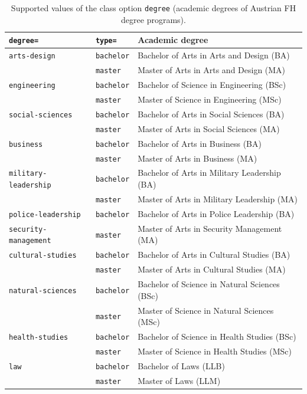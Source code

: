 \documentclass[language=english]{hgbarticle}
\begin{document}
\begin{table}[H]
\caption{Supported values of the class option \texttt{degree} (academic degrees of Austrian FH degree programs).}
\label{tab:AcademicDegrees}
\centering\small
\begin{tabular}{@{}lll@{}}
	\toprule
	\texttt{degree=} & \texttt{type=} & Academic degree \\
	\midrule
	\texttt{arts-design}         & \texttt{bachelor} & Bachelor of Arts in Arts and Design (BA) \\
	                             & \texttt{master}   & Master of Arts in Arts and Design (MA) \\ \addlinespace
	\texttt{engineering}         & \texttt{bachelor} & Bachelor of Science in Engineering (BSc) \\
	                             & \texttt{master}   & Master of Science in Engineering (MSc) \\ \addlinespace
	\texttt{social-sciences}     & \texttt{bachelor} & Bachelor of Arts in Social Sciences (BA) \\
	                             & \texttt{master}   & Master of Arts in Social Sciences (MA) \\ \addlinespace
	\texttt{business}            & \texttt{bachelor} & Bachelor of Arts in Business (BA) \\
	                             & \texttt{master}   & Master of Arts in Business (MA) \\ \addlinespace
	\texttt{military-leadership} & \texttt{bachelor} & Bachelor of Arts in Military Leadership (BA) \\
	                             & \texttt{master}   & Master of Arts in Military Leadership (MA) \\ \addlinespace
	\texttt{police-leadership}   & \texttt{bachelor} & Bachelor of Arts in Police Leadership (BA) \\ \addlinespace
	\texttt{security-management} & \texttt{master}   & Master of Arts in Security Management (MA) \\ \addlinespace
	\texttt{cultural-studies}    & \texttt{bachelor} & Bachelor of Arts in Cultural Studies (BA) \\
	                             & \texttt{master}   & Master of Arts in Cultural Studies (MA) \\ \addlinespace
	\texttt{natural-sciences}    & \texttt{bachelor} & Bachelor of Science in Natural Sciences (BSc) \\
	                             & \texttt{master}   & Master of Science in Natural Sciences (MSc) \\ \addlinespace
	\texttt{health-studies}      & \texttt{bachelor} & Bachelor of Science in Health Studies (BSc) \\
	                             & \texttt{master}   & Master of Science in Health Studies (MSc) \\ \addlinespace
	\texttt{law}                 & \texttt{bachelor} & Bachelor of Laws (LLB) \\
	                             & \texttt{master}   & Master of Laws (LLM) \\
	\bottomrule
\end{tabular}
\end{table}
\end{document}
